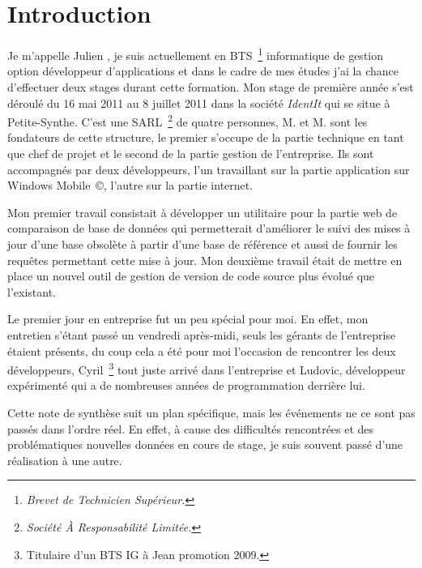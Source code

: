 \chapter{Introduction} %
\label{cha:Introduction}

Je m'appelle Julien , je suis actuellement en BTS\,
\footnote{\emph{Brevet de Technicien Supérieur.}} informatique de gestion
option développeur d'applications et dans le cadre de mes études j'ai la chance
d'effectuer deux stages durant cette formation. Mon stage de première année
s'est déroulé du 16 mai 2011 au 8 juillet 2011 dans la société \emph{IdentIt}
qui se situe à Petite-Synthe. C'est une SARL\, \footnote{\emph{Société À
Responsabilité Limitée.}} de quatre personnes, M. et
M. sont les fondateurs de cette structure, le premier s'occupe de
la partie technique en tant que chef de projet et le second de la partie
gestion de l'entreprise. Ils sont accompagnés par deux développeurs, l'un
travaillant sur la partie application sur Windows Mobile~\copyright, l'autre
sur la partie internet.

Mon premier travail consistait à développer un utilitaire pour la partie web de
comparaison de base de données qui permetterait d'améliorer le suivi des mises
à jour d'une base obsolète à partir d'une base de référence et aussi de fournir
les requêtes permettant cette mise à jour. Mon deuxième travail était de mettre
en place un nouvel outil de gestion de version de code source plus évolué que
l'existant.

Le premier jour en entreprise fut un peu spécial pour moi. En effet, mon
entretien s'étant passé un vendredi après-midi, seuls les gérants de
l'entreprise étaient présents, du coup cela a été pour moi l'occasion de
rencontrer les deux développeurs, Cyril\, \footnote{Titulaire d'un BTS IG à
Jean  promotion 2009.} tout juste arrivé dans l'entreprise et
Ludovic, développeur expérimenté qui a de nombreuses années de programmation
derrière lui.

Cette note de synthèse suit un plan spécifique, mais les événements ne ce sont
pas passés dans l'ordre réel. En effet, à cause des difficultés rencontrées et
des problématiques nouvelles données en cours de stage, je suis souvent passé
d'une réalisation à une autre.
